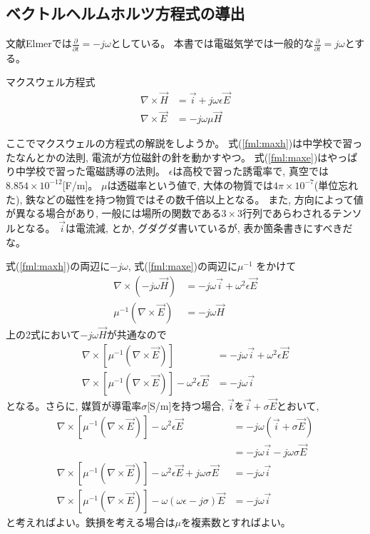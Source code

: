 \subsection{ベクトルヘルムホルツ方程式の導出}

文献Elmerでは$\frac{\partial}{\partial t}=-j\omega$としている。
本書では電磁気学では一般的な$\frac{\partial}{\partial t}=j\omega$とする。

マクスウェル方程式
\begin{align}
\nabla\times\vec{H}&=\vec{i}+j\omega\epsilon\vec{E}\label{fml:maxh}\\
\nabla\times\vec{E}&=-j\omega\mu\vec{H}\label{fml:maxe}
\end{align}

ここでマクスウェルの方程式の解説をしようか。
式(\ref{fml:maxh})は中学校で習ったなんとかの法則,
電流が方位磁針の針を動かすやつ。
式(\ref{fml:maxe})はやっぱり中学校で習った電磁誘導の法則。
$\epsilon$は高校で習った誘電率で,
真空では$8.854\times10^{-12}$[F/m]。
$\mu$は透磁率という値で,
大体の物質では$4\pi\times10^{-7}$(単位忘れた),
鉄などの磁性を持つ物質ではその数千倍以上となる。
また, 方向によって値が異なる場合があり,
一般には場所の関数である$3\times3$行列であらわされるテンソルとなる。
$\vec{i}$は電流減, とか, グダグダ書いているが, 表か箇条書きにすべきだな。

式(\ref{fml:maxh})の両辺に$-j\omega$,
式(\ref{fml:maxe})の両辺に$\mu^{-1}$ をかけて
\begin{align}
\nabla\times\left(-j\omega\vec{H}\right)
&=-j\omega\vec{i}+\omega^2\epsilon\vec{E}\\
\mu^{-1}\left(\nabla\times\vec{E}\right)
&=-j\omega\vec{H}
\end{align}
上の2式において$-j\omega\vec{H}$が共通なので
\begin{align}
\nabla\times\left[
\mu^{-1}\left(\nabla\times\vec{E}\right)
\right]
&=-j\omega\vec{i}+\omega^2\epsilon\vec{E}\\
\nabla\times\left[
\mu^{-1}\left(\nabla\times\vec{E}\right)
\right]-\omega^2\epsilon\vec{E}
&=-j\omega\vec{i}
\end{align}
となる。さらに, 媒質が導電率$\sigma$[S/m]を持つ場合,
$\vec{i}$を$\vec{i}+\sigma\vec{E}$とおいて,
\begin{align}
\nabla\times\left[
\mu^{-1}\left(\nabla\times\vec{E}\right)
\right]-\omega^2\epsilon\vec{E}
&=-j\omega\left(\vec{i}+\sigma\vec{E}\right)\\
&=-j\omega\vec{i}-j\omega\sigma\vec{E}\\
\nabla\times\left[
\mu^{-1}\left(\nabla\times\vec{E}\right)
\right]-\omega^2\epsilon\vec{E}+j\omega\sigma\vec{E}
&=-j\omega\vec{i}\\
\nabla\times\left[
\mu^{-1}\left(\nabla\times\vec{E}\right)
\right]-\omega\left(\omega\epsilon-j\sigma\right)\vec{E}
&=-j\omega\vec{i}
\end{align}
と考えればよい。鉄損を考える場合は$\mu$を複素数とすればよい。

